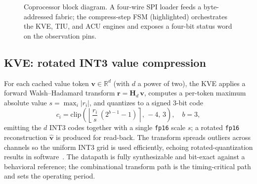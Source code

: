 \documentclass[conference]{IEEEtran}
\begin{document}
\begin{figure}[t]
\centering
{}
\caption{Coprocessor block diagram. A four-wire SPI loader feeds a byte-addressed
fabric; the compress-step FSM (highlighted) orchestrates the KVE, TIU, and ACU
engines and exposes a four-bit status word on the observation pins.}
\label{fig:arch}
\end{figure}

\subsection{KVE: rotated INT3 value compression}
For each cached value token $\mathbf{v}\in\mathbb{R}^{d}$ (with $d$ a power of
two), the KVE applies a forward Walsh--Hadamard transform
$\mathbf{r}=\mathbf{H}_d\,\mathbf{v}$, computes a per-token maximum absolute value
$s=\max_i |r_i|$, and quantizes to a signed 3-bit code
\begin{equation}
c_i=\mathrm{clip}\!\left(\left\lfloor \frac{r_i}{s}\,(2^{b-1}-1)\right\rceil,\,-4,\,3\right),\quad b=3,
\end{equation}
emitting the $d$ INT3 codes together with a single \texttt{fp16} scale $s$; a
rotated \texttt{fp16} reconstruction $\hat{\mathbf{v}}$ is produced for read-back.
The transform spreads outliers across channels so the uniform INT3 grid is used
efficiently, echoing rotated-quantization results in
software~\cite{quarot,kvquant}. The datapath is fully synthesizable and
bit-exact against a behavioral reference; the combinational transform path is the
timing-critical path and sets the operating period.
\end{document}
